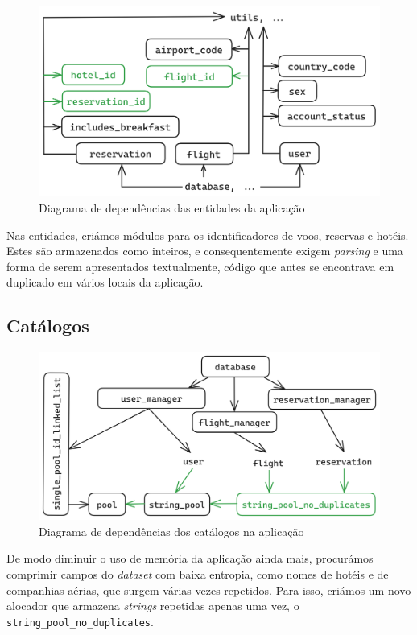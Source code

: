 \documentclass[12pt, a4paper]{article}
\begin{document}
\begin{figure}[ht]
    \centering
    \includegraphics[scale=0.2]{res-fase2/entities.png}
    \caption{Diagrama de dependências das entidades da aplicação}
    \label{fig:entities}
\end{figure}

Nas entidades, criámos módulos para os identificadores de voos, reservas e hotéis. Estes são
armazenados como inteiros, e consequentemente exigem \emph{parsing} e uma forma de serem
apresentados textualmente, código que antes se encontrava em duplicado em vários locais da
aplicação.

\subsection{Catálogos}
\label{sec:catalogs}

\begin{figure}[ht]
    \centering
    \includegraphics[scale=0.17]{res-fase2/database.png}
    \caption{Diagrama de dependências dos catálogos na aplicação}
    \label{fig:catalogs}
\end{figure}

De modo diminuir o uso de memória da aplicação ainda mais, procurámos comprimir campos do
\emph{dataset} com baixa entropia, como nomes de hotéis e de companhias aérias, que surgem várias
vezes repetidos. Para isso, criámos um novo alocador que armazena \emph{strings} repetidas apenas
uma vez, o \texttt{string\_pool\_no\_duplicates}.
\end{document}
